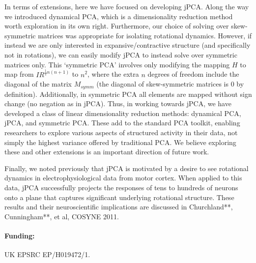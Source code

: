 \documentclass[11pt]{article}%
\newcommand{\reals}{I\!\!R} %
\begin{document}
In terms of extensions, here we have focused on developing jPCA.  Along the way we introduced dynamical PCA, which is a dimensionality reduction method worth exploration in its own right.  Furthermore, our choice of solving over skew-symmetric matrices was appropriate for isolating rotational dynamics.  However, if instead we are only interested in expansive/contractive structure (and specifically not in rotations), we can easily modify jPCA to instead solve over symmetric matrices only.  This `symmetric PCA' involves only modifying the mapping $H$ to map from $\reals^{\frac{1}{2}n(n+1)}$ to $n^2$, where the extra $n$ degrees of freedom include the diagonal of the matrix $M_{symm}$ (the diagonal of skew-symmetric matrices is 0 by definition).  Additionally, in symmetric PCA all elements are mapped without sign change (no negation as in jPCA).  Thus, in working towards jPCA, we have developed a class of linear dimensionality reduction methods: dynamical PCA, jPCA, and symmetric PCA.  These add to the standard PCA toolkit, enabling researchers to explore various aspects of structured activity in their data, not simply the highest variance offered by traditional PCA.  We believe exploring these and other extensions is an important direction of future work.

Finally, we noted previously that jPCA is motivated by a desire to see rotational dynamics in electrophysiological data from motor cortex.  When applied to this data, jPCA successfully projects the responses of tens to hundreds of neurons onto a plane that captures significant underlying rotational structure.  These results and their neuroscientific implications are discussed in Churchland**, Cunningham**, et al, COSYNE 2011.




\paragraph*{Funding:} UK EPSRC EP/H019472/1. 


%

\end{document}
